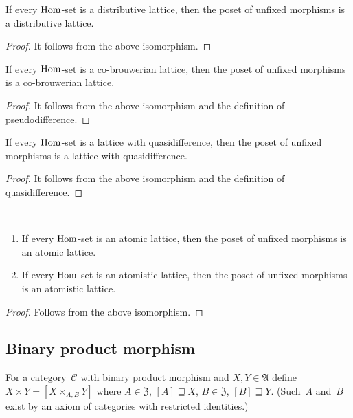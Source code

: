 \begin{prop}
If every $\operatorname{Hom}$-set is a distributive lattice, then
the poset of unfixed morphisms is a distributive lattice.
\end{prop}

\begin{proof}
It follows from the above isomorphism.
\end{proof}

\begin{prop}
If every $\operatorname{Hom}$-set is a co-brouwerian lattice, then
the poset of unfixed morphisms is a co-brouwerian lattice.
\end{prop}

\begin{proof}
It follows from the above isomorphism and the definition
of pseudodifference.
\end{proof}

\begin{prop}
If every $\operatorname{Hom}$-set is a lattice with quasidifference, then
the poset of unfixed morphisms is a lattice with
quasidifference.
\end{prop}

\begin{proof}
It follows from the above isomorphism and the definition
of quasidifference.
\end{proof}

\begin{prop}
~
\begin{enumerate}
\item If every $\operatorname{Hom}$-set is an atomic lattice, then
the poset of unfixed morphisms is an atomic lattice.
\item If every $\operatorname{Hom}$-set is an atomistic lattice, then
the poset of unfixed morphisms is an atomistic lattice.
\end{enumerate}
\end{prop}

\begin{proof}
Follows from the above isomorphism.
\end{proof}

\subsection{Binary product morphism}

\begin{defn}
For a category~$\mathcal{C}$ with binary product morphism
and $X,Y\in\mathfrak{A}$ define
$X\times Y=[X\times_{A,B}Y]$ where
$A\in\mathfrak{Z}$, $[A]\sqsupseteq X$,
$B\in\mathfrak{Z}$, $[B]\sqsupseteq Y$.
(Such~$A$ and~$B$ exist by an axiom of categories with
restricted identities.)
\end{defn}

